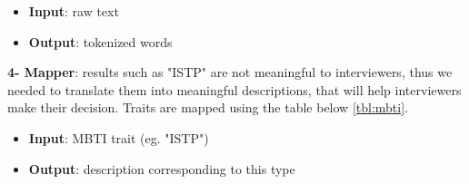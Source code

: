 \begin{itemize}
    \item \textbf{Input}: raw text
    \item \textbf{Output}: tokenized words\\
\end{itemize}


\textbf{4- Mapper}: results such as "ISTP" are not meaningful to interviewers, thus we needed to translate them into meaningful descriptions, that will help interviewers make their decision. Traits are mapped using the table below \ref{tbl:mbti}.

\begin{itemize}
    \item \textbf{Input}: MBTI trait (eg. "ISTP")
    \item \textbf{Output}: description corresponding to this type\\
\end{itemize}
 
